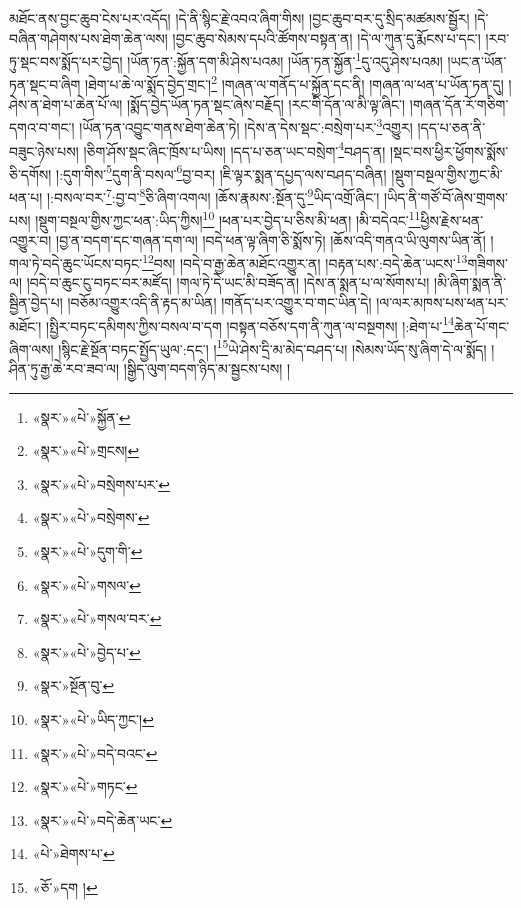 \documentclass[12pt,a4paper]{book}
\begin{document}
མཐོང་ནས་བྱང་ཆུབ་ངེས་པར་འདོད། །དེ་ནི་སྙིང་རྗེ་འབའ་ཞིག་གིས། །བྱང་ཆུབ་བར་དུ་སྲིད་མཚམས་སྦྱོར། །དེ་བཞིན་གཤེགས་པས་ཐེག་ཆེན་ལས། །བྱང་ཆུབ་སེམས་དཔའི་ཚོགས་བསྟན་ན། །དེ་ལ་ཀུན་དུ་རྨོངས་པ་དང་། །རབ་ཏུ་སྡང་བས་སྨོད་པར་བྱེད། །ཡོན་ཏན་:སྐྱོན་དག་མི་ཤེས་པའམ། །ཡོན་ཏན་སྐྱོན་\footnote{«སྣར་»«པེ་»སྐྱོན་}དུ་འདུ་ཤེས་པའམ། །ཡང་ན་ཡོན་ཏན་སྡང་བ་ཞིག །ཐེག་པ་ཆེ་ལ་སྨོད་བྱེད་གྲང་།\footnote{«སྣར་»«པེ་»གྲངས།} །གཞན་ལ་གནོད་པ་སྐྱོན་དང་ནི། །གཞན་ལ་ཕན་པ་ཡོན་ཏན་དུ། །ཤེས་ན་ཐེག་པ་ཆེན་པོ་ལ། །སྨོད་བྱེད་ཡོན་ཏན་སྡང་ཞེས་བརྗོད། །རང་གི་དོན་ལ་མི་ལྟ་ཞིང་། །གཞན་དོན་རོ་གཅིག་དགའ་བ་གང་། །ཡོན་ཏན་འབྱུང་གནས་ཐེག་ཆེན་ཏེ། །དེས་ན་དེས་སྡང་:བསྲེག་པར་\footnote{«སྣར་»«པེ་»བསྲེགས་པར་}འགྱུར། །དད་པ་ཅན་ནི་བཟུང་ཉེས་པས། །ཅིག་ཤོས་སྡང་ཞིང་ཁྲོས་པ་ཡིས། །དད་པ་ཅན་ཡང་བསྲེག་\footnote{«སྣར་»«པེ་»བསྲེགས་}བཤད་ན། །སྡང་བས་ཕྱིར་ཕྱོགས་སྨོས་ཅི་དགོས། །:དུག་གིས་\footnote{«སྣར་»«པེ་»དུག་གི་}དུག་ནི་བསལ་\footnote{«སྣར་»«པེ་»གསལ་}བྱ་བར། །ཇི་ལྟར་སྨན་དཔྱད་ལས་བཤད་བཞིན། །སྡུག་བསྔལ་གྱིས་ཀྱང་མི་ཕན་པ། །:བསལ་བར་\footnote{«སྣར་»«པེ་»གསལ་བར་}:བྱ་བ་\footnote{«སྣར་»«པེ་»བྱེད་པ་}ཅི་ཞིག་འགལ། །ཆོས་རྣམས་:སྔོན་དུ་\footnote{«སྣར་»སྔོན་བུ་}ཡིད་འགྲོ་ཞིང་། །ཡིད་ནི་གཙོ་བོ་ཞེས་གྲགས་པས། །སྡུག་བསྔལ་གྱིས་ཀྱང་ཕན་:ཡིད་ཀྱིས།\footnote{«སྣར་»«པེ་»ཡིད་ཀྱང་།} །ཕན་པར་བྱེད་པ་ཅིས་མི་ཕན། །མི་བདེའང་\footnote{«སྣར་»«པེ་»བདེ་བའང་}ཕྱིས་རྗེས་ཕན་འགྱུར་བ། །བྱ་ན་བདག་དང་གཞན་དག་ལ། །བདེ་ཕན་ལྟ་ཞིག་ཅི་སྨོས་ཏེ། །ཆོས་འདི་གནའ་ཡི་ལུགས་ཡིན་ནོ། །གལ་ཏེ་བདེ་ཆུང་ཡོངས་བཏང་\footnote{«སྣར་»«པེ་»གཏང་}བས། །བདེ་བ་རྒྱ་ཆེན་མཐོང་འགྱུར་ན། །བརྟན་པས་:བདེ་ཆེན་ཡངས་\footnote{«སྣར་»«པེ་»བདེ་ཆེན་ཡང་}གཟིགས་ལ། །བདེ་བ་ཆུང་ངུ་བཏང་བར་མཛོད། །གལ་ཏེ་དེ་ཡང་མི་བཟོད་ན། །དེས་ན་སྨན་པ་ལ་སོགས་པ། །མི་ཞིག་སྨན་ནི་སྦྱིན་བྱེད་པ། །བཅོམ་འགྱུར་འདི་ནི་རྟད་མ་ཡིན། །གནོད་པར་འགྱུར་བ་གང་ཡིན་དེ། །ལ་ལར་མཁས་པས་ཕན་པར་མཐོང་། །སྤྱིར་བཏང་དམིགས་ཀྱིས་བསལ་བ་དག །བསྟན་བཅོས་དག་ནི་ཀུན་ལ་བསྔགས། །:ཐེག་པ་\footnote{«པེ་»ཐེགས་པ་}ཆེན་པོ་གང་ཞིག་ལས། །སྙིང་རྗེ་སྔོན་བཏང་སྤྱོད་ཡུལ་:དང་། །\footnote{«ཅོ་»དག །}ཡེ་ཤེས་དྲི་མ་མེད་བཤད་པ། །སེམས་ཡོད་སུ་ཞིག་དེ་ལ་སྨོད། །ཤིན་ཏུ་རྒྱ་ཆེ་རབ་ཟབ་ལ། །སྒྱིད་ལུག་བདག་ཉིད་མ་སྦྱངས་པས། །
\end{document}
